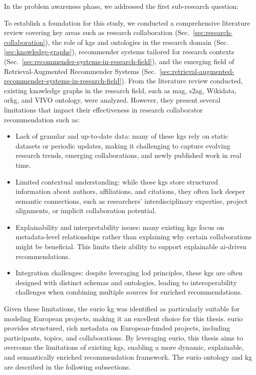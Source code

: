 In the problem awareness phase, we addressed the first sub-research question:
\begin{center}
    \rqOne
\end{center}
To establish a foundation for this study, we conducted a comprehensive literature review covering key areas such as research collaboration (Sec.~\ref{sec:research-collaboration}), the role of \glspl{kg} and ontologies in the research domain (Sec.\ref{sec:knowledge-graphs}), recommender systems tailored for research contexts (Sec.~\ref{sec:recommender-systems-in-research-field}), and the emerging field of Retrieval-Augmented Recommender Systems (Sec.~\ref{sec:retrieval-augmented-recommender-systems-in-research-field}).
From the literature review conducted, existing knowledge graphs in the research field, such as \gls{mag}, \gls{s2ag}, Wikidata, \gls{orkg}, and VIVO ontology, were analyzed.
However, they present several limitations that impact their effectiveness in research collaborator recommendation such as:
\begin{itemize}
    \item Lack of granular and up-to-date data: many of these \glspl{kg} rely on static datasets or periodic updates, making it challenging to capture evolving research trends, emerging collaborations, and newly published work in real time.
    \item Limited contextual understanding: while these \glspl{kg} store structured information about authors, affiliations, and citations, they often lack deeper semantic connections, such as researchers' interdisciplinary expertise, project alignments, or implicit collaboration potential.
    \item Explainability and interpretability issues: many existing \glspl{kg} focus on metadata-level relationships rather than explaining why certain collaborations might be beneficial. This limits their ability to support explainable \gls{ai}-driven recommendations.
    \item Integration challenges: despite leveraging \gls{lod} principles, these \glspl{kg} are often designed with distinct schemas and ontologies, leading to interoperability challenges when combining multiple sources for enriched recommendations.
\end{itemize}

Given these limitations, the \gls{eurio} \gls{kg} was identified as particularly suitable for modeling European projects, making it an excellent choice for this thesis.
\gls{eurio} provides structured, rich metadata on European-funded projects, including participants, topics, and collaborations.
By leveraging \gls{eurio}, this thesis aims to overcome the limitations of existing \glspl{kg}, enabling a more dynamic, explainable, and semantically enriched recommendation framework.
The \gls{eurio} ontology and \gls{kg} are described in the following subsections.

